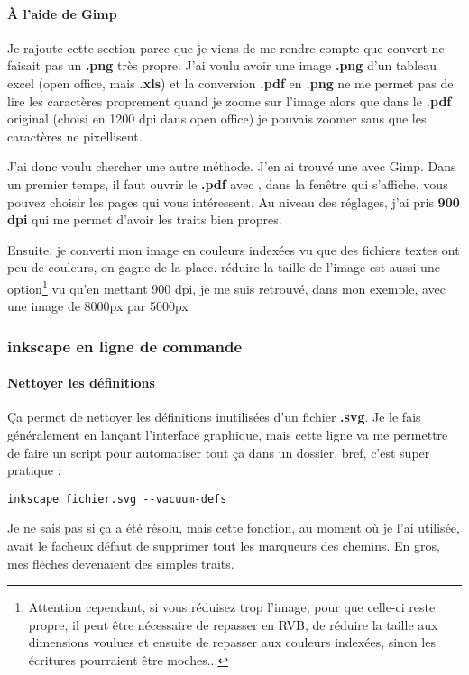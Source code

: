 \documentclass[a4paper,twoside]{article}
\begin{document}
\paragraph{À l'aide de Gimp}
Je rajoute cette section parce que je viens de me rendre compte que convert ne faisait pas un \textbf{.png} très propre. J'ai voulu avoir une image \textbf{.png} d'un tableau excel (open office, mais \textbf{.xls}) et la conversion \textbf{.pdf} en \textbf{.png} ne me permet pas de lire les caractères proprement quand je zoome sur l'image alors que dans le \textbf{.pdf} original (choisi en 1200 dpi dans open office) je pouvais zoomer sans que les caractères ne pixellisent.

J'ai donc voulu chercher une autre méthode. J'en ai trouvé une avec Gimp.
Dans un premier temps, il faut ouvrir le \textbf{.pdf} avec , dans la fenêtre qui s'affiche, vous pouvez choisir les pages qui vous intéressent. Au niveau des réglages, j'ai pris \textbf{900 dpi} qui me permet d'avoir les traits bien propres.

Ensuite, je converti mon image en couleurs indexées vu que des fichiers textes ont peu de couleurs, on gagne de la place.
réduire la taille de l'image est aussi une option\footnote{Attention cependant, si vous réduisez trop l'image, pour que celle-ci reste propre, il peut être nécessaire de repasser en RVB, de réduire la taille aux dimensions voulues et ensuite de repasser aux couleurs indexées, sinon les écritures pourraient être moches...} vu qu'en mettant 900 dpi, je me suis retrouvé, dans mon exemple, avec une image de 8000px par 5000px

\subsubsection{inkscape en ligne de commande}
\paragraph{Nettoyer les définitions}
Ça permet de nettoyer les définitions inutilisées d'un fichier \textbf{.svg}. Je le fais généralement en lançant l'interface graphique, mais cette ligne va me permettre de faire un script pour automatiser tout ça dans un dossier, bref, c'est super pratique :

\begin{verbatim}
inkscape fichier.svg --vacuum-defs
\end{verbatim}

\begin{attention}
Je ne sais pas si ça a été résolu, mais cette fonction, au moment où je l'ai utilisée, avait le facheux défaut de supprimer tout les marqueurs des chemins. En gros, mes flèches devenaient des simples traits.
\end{attention}
\end{document}
